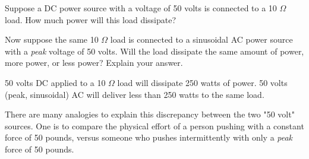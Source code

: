 

Suppose a DC power source with a voltage of 50 volts is connected to a 10 $\Omega$ load.  How much power will this load dissipate?

Now suppose the same 10 $\Omega$ load is connected to a sinusoidal AC power source with a {\it peak} voltage of 50 volts.  Will the load dissipate the same amount of power, more power, or less power?  Explain your answer.







50 volts DC applied to a 10 $\Omega$ load will dissipate 250 watts of power.  50 volts (peak, sinusoidal) AC will deliver less than 250 watts to the same load.







There are many analogies to explain this discrepancy between the two "50 volt" sources.  One is to compare the physical effort of a person pushing with a constant force of 50 pounds, versus someone who pushes intermittently with only a {\it peak} force of 50 pounds.




